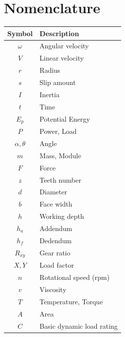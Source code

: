 \documentclass[12pt]{report}
\begin{document}
\section*{Nomenclature}
\begin{table}[H]
\centering
\begin{tabular}{|c|l|}
\hline
\textbf{Symbol} & \textbf{Description} \\ \hline
$\omega$        & Angular velocity          \\ \hline
$V$             & Linear velocity           \\ \hline
$r$             & Radius                    \\ \hline
$s$             & Slip amount               \\ \hline
$I$             & Inertia                   \\ \hline
$t$             & Time                      \\ \hline
$E_p$           & Potential Energy          \\ \hline
$P$             & Power, Load               \\ \hline
$\alpha, \theta$ & Angle                     \\ \hline
$m$             & Mass, Module              \\ \hline
$F$             & Force                     \\ \hline
$z$             & Teeth number              \\ \hline
$d$             & Diameter                  \\ \hline
$b$             & Face width                \\ \hline
$h$             & Working depth             \\ \hline
$h_a$           & Addendum                  \\ \hline
$h_f$           & Dedendum                  \\ \hline
$R_{xy}$        & Gear ratio                \\ \hline
$X, Y$          & Load factor               \\ \hline
$n$             & Rotational speed (rpm)    \\ \hline
$v$             & Viscosity                 \\ \hline
$T$             & Temperature, Torque       \\ \hline
$A$             & Area                      \\ \hline
$C$             & Basic dynamic load rating \\ \hline

\end{tabular}
\end{table}
\end{document}
